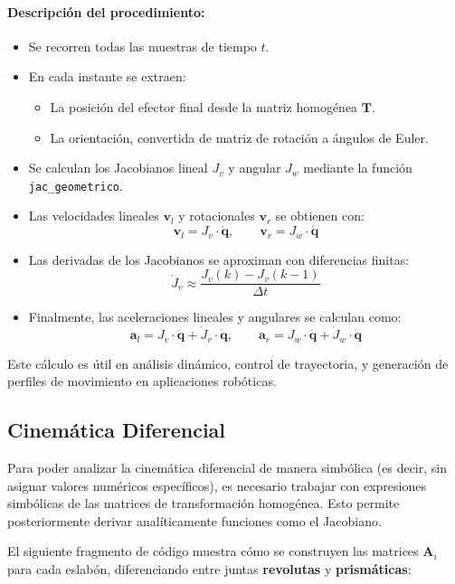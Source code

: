 \paragraph{Descripción del procedimiento:}
\begin{itemize}
	\item Se recorren todas las muestras de tiempo \( t \).
	\item En cada instante se extraen:
	\begin{itemize}
		\item La posición del efector final desde la matriz homogénea \( \mathbf{T} \).
		\item La orientación, convertida de matriz de rotación a ángulos de Euler.
	\end{itemize}
	\item Se calculan los Jacobianos lineal \( J_v \) y angular \( J_w \) mediante la función \texttt{jac\_geometrico}.
	\item Las velocidades lineales \( \mathbf{v}_l \) y rotacionales \( \mathbf{v}_r \) se obtienen con:
	\[
	\mathbf{v}_l = J_v \cdot \dot{\mathbf{q}}, \qquad \mathbf{v}_r = J_w \cdot \dot{\mathbf{q}}
	\]
	\item Las derivadas de los Jacobianos se aproximan con diferencias finitas:
	\[
	\dot{J}_v \approx \frac{J_v(k) - J_v(k-1)}{\Delta t}
	\]
	\item Finalmente, las aceleraciones lineales y angulares se calculan como:
	\[
	\mathbf{a}_l = J_v \cdot \ddot{\mathbf{q}} + \dot{J}_v \cdot \dot{\mathbf{q}}, \qquad
	\mathbf{a}_r = J_w \cdot \ddot{\mathbf{q}} + \dot{J}_w \cdot \dot{\mathbf{q}}
	\]
\end{itemize}

Este cálculo es útil en análisis dinámico, control de trayectoria, y generación de perfiles de movimiento en aplicaciones robóticas.



\subsection{Cinemática Diferencial}

Para poder analizar la cinemática diferencial de manera simbólica (es decir, sin asignar valores numéricos específicos), es necesario trabajar con expresiones simbólicas de las matrices de transformación homogénea. Esto permite posteriormente derivar analíticamente funciones como el Jacobiano.

El siguiente fragmento de código muestra cómo se construyen las matrices \( \mathbf{A}_i \) para cada eslabón, diferenciando entre juntas \textbf{revolutas} y \textbf{prismáticas}:

